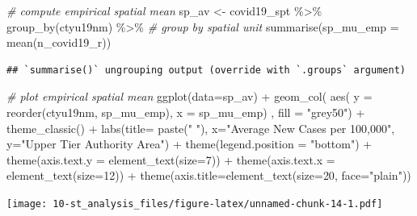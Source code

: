 \documentclass[
]{book}
\newenvironment{Shaded}{\begin{snugshade}}{\end{snugshade}}
\newcommand{\AttributeTok}[1]{\textcolor[rgb]{0.77,0.63,0.00}{#1}}
\newcommand{\CommentTok}[1]{\textcolor[rgb]{0.56,0.35,0.01}{\textit{#1}}}
\newcommand{\DecValTok}[1]{\textcolor[rgb]{0.00,0.00,0.81}{#1}}
\newcommand{\FunctionTok}[1]{\textcolor[rgb]{0.00,0.00,0.00}{#1}}
\newcommand{\NormalTok}[1]{#1}
\newcommand{\OtherTok}[1]{\textcolor[rgb]{0.56,0.35,0.01}{#1}}
\newcommand{\SpecialCharTok}[1]{\textcolor[rgb]{0.00,0.00,0.00}{#1}}
\newcommand{\StringTok}[1]{\textcolor[rgb]{0.31,0.60,0.02}{#1}}
\begin{document}
\begin{Shaded}
\begin{Highlighting}[]
\CommentTok{\# compute empirical spatial mean}
\NormalTok{sp\_av }\OtherTok{\textless{}{-}}\NormalTok{ covid19\_spt }\SpecialCharTok{\%\textgreater{}\%} \FunctionTok{group\_by}\NormalTok{(ctyu19nm) }\SpecialCharTok{\%\textgreater{}\%} \CommentTok{\# group by spatial unit}
  \FunctionTok{summarise}\NormalTok{(}\AttributeTok{sp\_mu\_emp =} \FunctionTok{mean}\NormalTok{(n\_covid19\_r))}
\end{Highlighting}
\end{Shaded}

\begin{verbatim}
## `summarise()` ungrouping output (override with `.groups` argument)
\end{verbatim}

\begin{Shaded}
\begin{Highlighting}[]
\CommentTok{\# plot empirical spatial mean}
\FunctionTok{ggplot}\NormalTok{(}\AttributeTok{data=}\NormalTok{sp\_av) }\SpecialCharTok{+}
  \FunctionTok{geom\_col}\NormalTok{( }\FunctionTok{aes}\NormalTok{( }\AttributeTok{y =} \FunctionTok{reorder}\NormalTok{(ctyu19nm, sp\_mu\_emp), }\AttributeTok{x =}\NormalTok{ sp\_mu\_emp) , }\AttributeTok{fill =} \StringTok{"grey50"}\NormalTok{) }\SpecialCharTok{+}
  \FunctionTok{theme\_classic}\NormalTok{() }\SpecialCharTok{+}
  \FunctionTok{labs}\NormalTok{(}\AttributeTok{title=} \FunctionTok{paste}\NormalTok{(}\StringTok{" "}\NormalTok{), }\AttributeTok{x=}\StringTok{"Average New Cases per 100,000"}\NormalTok{, }\AttributeTok{y=}\StringTok{"Upper Tier Authority Area"}\NormalTok{) }\SpecialCharTok{+}
  \FunctionTok{theme}\NormalTok{(}\AttributeTok{legend.position =} \StringTok{"bottom"}\NormalTok{) }\SpecialCharTok{+}
  \FunctionTok{theme}\NormalTok{(}\AttributeTok{axis.text.y =} \FunctionTok{element\_text}\NormalTok{(}\AttributeTok{size=}\DecValTok{7}\NormalTok{)) }\SpecialCharTok{+}
  \FunctionTok{theme}\NormalTok{(}\AttributeTok{axis.text.x =} \FunctionTok{element\_text}\NormalTok{(}\AttributeTok{size=}\DecValTok{12}\NormalTok{)) }\SpecialCharTok{+}
  \FunctionTok{theme}\NormalTok{(}\AttributeTok{axis.title=}\FunctionTok{element\_text}\NormalTok{(}\AttributeTok{size=}\DecValTok{20}\NormalTok{, }\AttributeTok{face=}\StringTok{"plain"}\NormalTok{))}
\end{Highlighting}
\end{Shaded}

\texttt{[image: 10-st\_analysis\_files/figure-latex/unnamed-chunk-14-1.pdf]}
\end{document}
